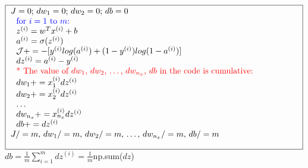 \documentclass{article}
\begin{document}
$\noindent\fbox{
\parbox{\textwidth}{
$J=0$; $dw_1 = 0$; $dw_2 = 0$; $db=0$\\

$\indent$ $\indent$ \textcolor{blue}{for $i=1$ to $m$:}\\
$\indent$ $\indent$ $z^{(i)} = w^T x^{(i)} + b$\\
$\indent$ $\indent$ $a^{(i)} = \sigma(z^{(i)})$\\
$\indent$ $\indent$ $\mathcal{J} += -[y^{(i)} log(a^{(i)}) + (1-y^{(i)})log(1-a^{(i)})]$\\
$\indent$ $\indent$ $dz^{(i)} = a^{(i)}- y^{(i)}$\\

$\indent$ $\indent$ \textcolor{red}{* The value of $dw_1$, $dw_2$, $\dots$, $dw_{n_x}$, $db$ in the code is cumulative:}\\
$\indent$ $\indent$ $dw_1 += x_1^{(i)}dz^{(i)}$\\
$\indent$ $\indent$ $dw_2 += x_2^{(i)}dz^{(i)}$\\
$\indent$ $\indent$ $\dots$\\
$\indent$ $\indent$ $dw_{n_x} += x_{n_x}^{(i)}dz^{(i)}$\\

$\indent$ $\indent$ $db += dz^{(i)}$\\

$J/=m$,  $dw_1 /=m$,  $dw_2 /=m$, \dots, $dw_{n_x} /=m$, $db /=m$\\
    }
}$\\


$db = \frac{1}{m}\sum_{i=1}^{m}dz^{(i)} = \frac{1}{m}$np.sum($dz$)\\
\end{document}
